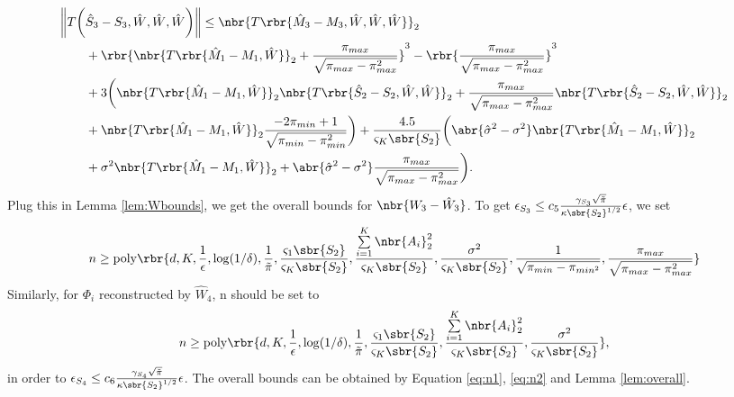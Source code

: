 \documentclass[twoside,11pt]{article}
\begin{document}
{\begin{align}
\end{align}
\begin{align}
 \bigg \lVert T\bigg(&\hat{S}_3-S_3,\hat{W},\hat{W},\hat{W}\bigg) \bigg \rVert \leq \nbr{T\rbr{\hat{M}_3-M_3, \hat{W},\hat{W},\hat{W}}}_2 \nonumber\\
    &+ \rbr{ \nbr{T\rbr{\hat{M}_1-M_1,\hat{W}}}_2 +  \frac{\pi_{max}}{\sqrt{\pi_{max}-\pi_{max}^2 }}}^3- \rbr{\frac{\pi_{max}}{\sqrt{\pi_{max}-\pi_{max}^2 }}}^3\nonumber\\
    &+ 3\bigg(\nbr{T\rbr{ \hat{M}_1-M_1,\hat{W} }}_2  \nbr{T\rbr{ \hat{S}_2-S_2 ,\hat{W},\hat{W}  }}_2 +  \frac{\pi_{max}}{\sqrt{\pi_{max}-\pi_{max}^2 }}  \nbr{T\rbr{ \hat{S}_2-S_2 ,\hat{W},\hat{W}  }}_2 \nonumber\\
    &+ \nbr{T\rbr{ \hat{M}_1-M_1 ,\hat{W}  }}_2  \frac{-2\pi_{min}+1}{\sqrt{\pi_{min}-\pi_{min}^2}} \bigg) +\frac{4.5}{\varsigma_K\sbr{S_2}} \bigg( \abr{\hat{\sigma}^2-\sigma^2} \nbr{T\rbr{\hat{M}_1-M_1,\hat{W}}}_2\nonumber \\
    &+ \sigma^2\nbr{T\rbr{\hat{M}_1-M_1,\hat{W}}}_2+ \abr{\hat{\sigma}^2-\sigma^2}   \frac{\pi_{max}}{\sqrt{\pi_{max}-\pi_{max}^2 }} \bigg).
\end{align}
Plug this in Lemma \ref{lem:Wbounds}, we get the overall bounds for $\nbr{W_3-\hat{W}_3}$. To get $\epsilon_{S_3} \leq c_5 \frac{\gamma_{S_3} \sqrt{\tilde{\pi}}}{\kappa\sbr{S_2}^{1/2}} \epsilon$, we set 
\begin{align}
\label{eq:n1}
   n \geq \mathrm{poly}\rbr{d, K, \frac{1}{\epsilon}, \log(1/\delta), \frac{1}{\tilde{\pi}},\frac{ \varsigma_1\sbr{S_2}}{ \varsigma_K\sbr{S_2}}, \frac{\sum \limits_{i=1}^K \nbr{A_i}_2^2}{  \varsigma_K\sbr{S_2} }, \frac{\sigma^2}{  \varsigma_K\sbr{S_2}},\frac{1}{\sqrt{\pi_{min}-\pi_{min^2}}}, \frac{\pi_{max}}{\sqrt{\pi_{max}-\pi_{max}^2 }}}
\end{align}
Similarly, for $\Phi_i$ reconstructed by $\hat{W}_4$, n should be set to 
\begin{align}
\label{eq:n2}
  n \geq \mathrm{poly}\rbr{d, K, \frac{1}{\epsilon}, \log(1/\delta), \frac{1}{\tilde{\pi}},\frac{ \varsigma_1\sbr{S_2}}{ \varsigma_K\sbr{S_2}}, \frac{\sum \limits_{i=1}^K \nbr{A_i}_2^2}{  \varsigma_K\sbr{S_2} }, \frac{\sigma^2}{  \varsigma_K\sbr{S_2}}},
\end{align}
in order to  $\epsilon_{S_4} \leq c_6 \frac{\gamma_{S_4} \sqrt{\tilde{\pi}}}{\kappa\sbr{S_2}^{1/2}} \epsilon$.
The overall bounds can be obtained by Equation \ref{eq:n1}, \ref{eq:n2} and Lemma \ref{lem:overall}.
}
\end{document}
